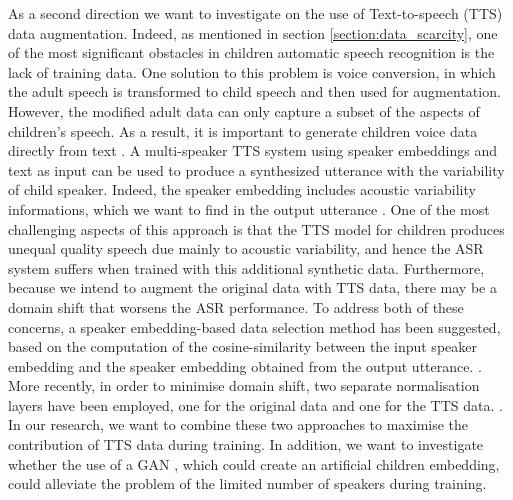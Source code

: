 As a second direction we want to investigate on the use of Text-to-speech (TTS) data augmentation. Indeed, as mentioned in section \ref{section:data_scarcity}, one of the most significant obstacles in children automatic speech recognition is the lack of training data. One solution to this problem is voice conversion, in which the adult speech is transformed to child speech and then used for augmentation. However, the modified adult data can only capture a subset of the aspects of children's speech. As a result, it is important to generate children voice data directly from text \cite{wang2021towards}. A multi-speaker TTS system using speaker embeddings and  text  as input can be used to produce a synthesized utterance with the variability of child speaker. Indeed, the speaker embedding includes acoustic variability informations, which we want to find in the output utterance \cite{cooper2020zero,kim2021conditional}. One of the most challenging aspects of this approach is that the TTS model for children produces unequal quality speech due mainly to acoustic variability, and hence the ASR system suffers when trained with this additional synthetic data. Furthermore, because we intend to augment the original data with TTS data, there may be a domain shift that worsens the ASR performance. To address both of these concerns, a speaker embedding-based data selection method has been suggested, based on the computation of the cosine-similarity between the input speaker embedding and the speaker embedding obtained from the output utterance. \cite{wang2021towards}. More recently, in order to minimise domain shift, two separate normalisation layers have been employed, one for the original data and one for the TTS data. \cite{hu2022synt++}. In our research, we want to combine these two approaches to maximise the contribution of TTS data during training. In addition, we want to investigate whether the use of a GAN \cite{goodfellow2014generative}, which could create an artificial children embedding, could alleviate the problem of the limited number of speakers during training.

